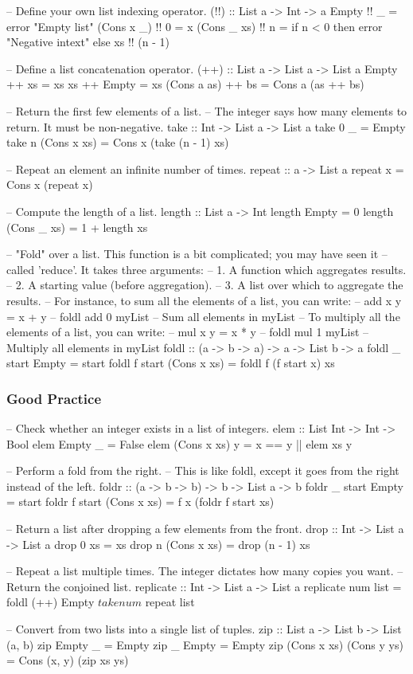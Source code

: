 \documentclass{article}
\begin{document}
\begin{haskellcode}
-- Define your own list indexing operator.
(!!) :: List a -> Int -> a
Empty !! _ = error "Empty list"
(Cons x _) !! 0 = x
(Cons _ xs) !! n = 
  if n < 0
  then error "Negative intext"
  else xs !! (n - 1)

-- Define a list concatenation operator.
(++) :: List a -> List a -> List a
Empty ++ xs = xs
xs ++ Empty = xs
(Cons a as) ++ bs = Cons a (as ++ bs)

-- Return the first few elements of a list.
-- The integer says how many elements to return. It must be non-negative.
take :: Int -> List a -> List a
take 0 _ = Empty
take n (Cons x xs) = Cons x (take (n - 1) xs)

-- Repeat an element an infinite number of times.
repeat :: a -> List a
repeat x = Cons x (repeat x)

-- Compute the length of a list.
length :: List a -> Int
length Empty = 0
length (Cons _ xs) = 1 + length xs

-- "Fold" over a list. This function is a bit complicated; you may have seen it
-- called 'reduce'. It takes three arguments:
--   1. A function which aggregates results.
--   2. A starting value (before aggregation).
--   3. A list over which to aggregate the results.
-- For instance, to sum all the elements of a list, you can write:
--     add x y = x + y
--     foldl add 0 myList -- Sum all elements in myList
-- To multiply all the elements of a list, you can write:
--     mul x y = x * y
--     foldl mul 1 myList -- Multiply all elements in myList
foldl :: (a -> b -> a) -> a -> List b -> a
foldl _ start Empty = start
foldl f start (Cons x xs) = 
  foldl f (f start x) xs
\end{haskellcode}

\subsubsection*{Good Practice}

\begin{haskellcode}
-- Check whether an integer exists in a list of integers.
elem :: List Int -> Int -> Bool
elem Empty _ = False
elem (Cons x xs) y = 
  x == y || elem xs y

-- Perform a fold from the right.
-- This is like foldl, except it goes from the right instead of the left.
foldr :: (a -> b -> b) -> b -> List a -> b
foldr _ start Empty = start
foldr f start (Cons x xs) =
  f x (foldr f start xs)

-- Return a list after dropping a few elements from the front.
drop :: Int -> List a -> List a
drop 0 xs = xs
drop n (Cons x xs) = drop (n - 1) xs 

-- Repeat a list multiple times. The integer dictates how many copies you want.
-- Return the conjoined list.
replicate :: Int -> List a -> List a
replicate num list =
  foldl (++) Empty $ take num $ repeat list

-- Convert from two lists into a single list of tuples.
zip :: List a -> List b -> List (a, b)
zip Empty _ = Empty
zip _ Empty = Empty
zip (Cons x xs) (Cons y ys) = Cons (x, y) (zip xs ys)
\end{haskellcode}
\end{document}
